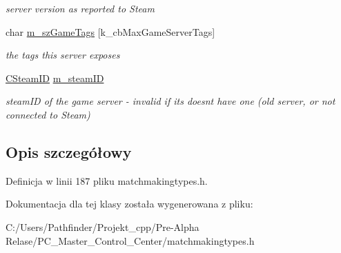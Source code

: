 \begin{DoxyCompactItemize}
\begin{DoxyCompactList}\small\item\em server version as reported to Steam \end{DoxyCompactList}\item 
\mbox{\label{classgameserveritem__t_a1372815e9fb666d741ea23b66509d91f}} 
char \hyperlink{classgameserveritem__t_a1372815e9fb666d741ea23b66509d91f}{m\+\_\+sz\+Game\+Tags} \mbox{[}k\+\_\+cb\+Max\+Game\+Server\+Tags\mbox{]}
\begin{DoxyCompactList}\small\item\em the tags this server exposes \end{DoxyCompactList}\item 
\mbox{\label{classgameserveritem__t_a2eae92d0752c4482bcd149a84bc59d02}} 
\hyperlink{class_c_steam_i_d}{C\+Steam\+ID} \hyperlink{classgameserveritem__t_a2eae92d0752c4482bcd149a84bc59d02}{m\+\_\+steam\+ID}
\begin{DoxyCompactList}\small\item\em steam\+ID of the game server -\/ invalid if it\textquotesingle{}s doesn\textquotesingle{}t have one (old server, or not connected to Steam) \end{DoxyCompactList}\end{DoxyCompactItemize}


\subsection{Opis szczegółowy}


Definicja w linii 187 pliku matchmakingtypes.\+h.



Dokumentacja dla tej klasy została wygenerowana z pliku\+:\begin{DoxyCompactItemize}
\item 
C\+:/\+Users/\+Pathfinder/\+Projekt\+\_\+cpp/\+Pre-\/\+Alpha Relase/\+P\+C\+\_\+\+Master\+\_\+\+Control\+\_\+\+Center/matchmakingtypes.\+h\end{DoxyCompactItemize}
